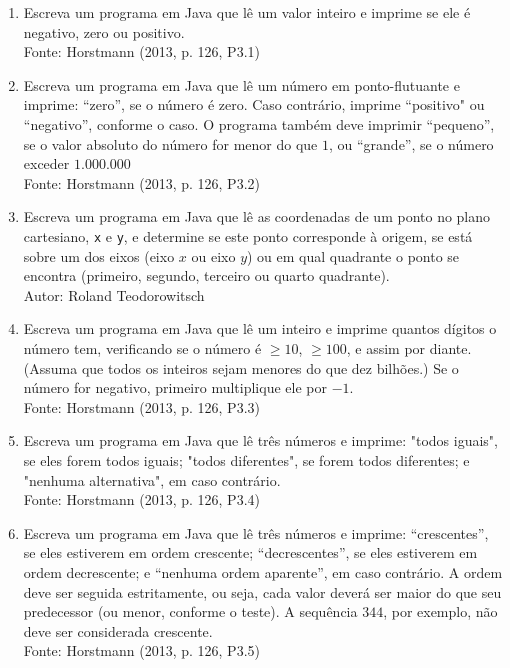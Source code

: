 \documentclass[onecolumn,a4paper,10pt]{report}
\newcommand{\+}{\, + \,}
\newcommand{\<}{\hspace*{-0.4cm}}
\begin{document}
\begin{enumerate}[1.]
\item Escreva um programa em Java que lê um valor inteiro e imprime se ele é negativo, zero ou positivo.\\
{\tiny Fonte: Horstmann (2013, p. 126, P3.1)}

\item Escreva um programa em Java que lê um número em ponto-flutuante e imprime: ``zero'', se o número é zero. Caso contrário, imprime ``positivo" ou ``negativo'', conforme o caso. O programa também deve imprimir ``pequeno'', se o valor absoluto do número for menor do que $1$, ou ``grande'', se o número exceder $1.000.000$\\
{\tiny Fonte: Horstmann (2013, p. 126, P3.2)}

\item Escreva um programa em Java que lê as coordenadas de um ponto no plano cartesiano, \texttt{x} e \texttt{y},
e determine se este ponto corresponde à origem, se está sobre um dos eixos (eixo $x$ ou eixo $y$) ou em qual
quadrante o ponto se encontra (primeiro, segundo, terceiro ou quarto quadrante).\\
{\tiny Autor: Roland Teodorowitsch}

\item Escreva um programa em Java que lê um inteiro e imprime quantos dígitos o número tem, verificando se o número é $\geqslant 10$, $\geqslant 100$, e assim por diante. (Assuma que todos os inteiros sejam menores do que dez bilhões.)
Se o número for negativo, primeiro multiplique ele por $-1$.\\
{\tiny Fonte: Horstmann (2013, p. 126, P3.3)}

\item Escreva um programa em Java que lê três números e imprime: "todos iguais", se eles forem todos iguais;
"todos diferentes", se forem todos diferentes; e "nenhuma alternativa", em caso contrário.\\
{\tiny Fonte: Horstmann (2013, p. 126, P3.4)}

\item Escreva um programa em Java que lê três números e imprime: ``crescentes'', se eles estiverem em ordem crescente;
``decrescentes'', se eles estiverem em ordem decrescente; e ``nenhuma ordem aparente'', em caso contrário. A ordem deve ser
seguida estritamente, ou seja, cada valor deverá ser maior do que seu predecessor (ou menor, conforme o teste). A sequência
$3 4 4$, por exemplo, não deve ser considerada crescente.\\
{\tiny Fonte: Horstmann (2013, p. 126, P3.5)}


\end{enumerate}
\end{document}
